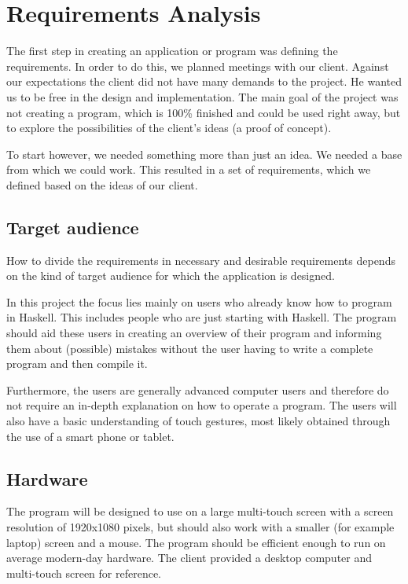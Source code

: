 \chapter{Requirements Analysis}

The first step in creating an application or program was defining the requirements. In order to do this, we planned meetings with our client. Against our expectations the client did not have many demands to the project. He wanted us to be free in the design and implementation. The main goal of the project was not creating a program, which is 100\% finished and could be used right away, but to explore the possibilities of the client's ideas (a proof of concept).

To start however, we needed something more than just an idea. We needed a base from which we could work. This resulted in a set of requirements, which we defined based on the ideas of our client.

\section{Target audience}

How to divide the requirements in necessary and desirable requirements depends on the kind of target audience for which the application is designed.  

In this project the focus lies mainly on users who already know how to program in Haskell. This includes people who are just starting with Haskell.
The program should aid these users in creating an overview of their program and informing them about (possible) mistakes without the user having to write a complete program and then compile it.

Furthermore, the users are generally advanced computer users and therefore do not require an in-depth explanation on how to operate a program. The users will also have a basic understanding of touch gestures, most likely obtained through the use of a smart phone or tablet.

\section{Hardware}

The program will be designed to use on a large multi-touch screen with a screen resolution of 1920x1080 pixels, but should also work with a smaller (for example laptop) screen and a mouse. The program should be efficient enough to run on average modern-day hardware. The client provided a desktop computer and multi-touch screen for reference.

